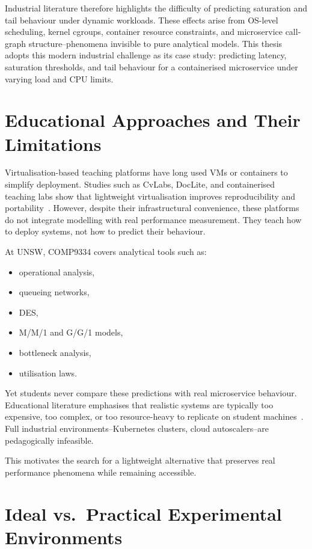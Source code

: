 Industrial literature therefore highlights the difficulty of predicting saturation and tail behaviour under dynamic workloads. These effects arise from OS-level scheduling, kernel cgroups, container resource constraints, and microservice call-graph structure--phenomena invisible to pure analytical models. This thesis adopts this modern industrial challenge as its case study: predicting latency, saturation thresholds, and tail behaviour for a containerised microservice under varying load and CPU limits.

\section{Educational Approaches and Their Limitations}

Virtualisation-based teaching platforms have long used VMs or containers to simplify deployment. Studies such as CvLabs, DocLite, and containerised teaching labs show that lightweight virtualisation improves reproducibility and portability~\cite{VituiChen2021}. However, despite their infrastructural convenience, these platforms do not integrate modelling with real performance measurement. They teach how to deploy systems, not how to predict their behaviour.


At UNSW, COMP9334 covers analytical tools such as:

\begin{itemize}
    \item operational analysis,
    \item queueing networks,
    \item DES,
    \item M/M/1 and G/G/1 models,
    \item bottleneck analysis,
    \item utilisation laws.
\end{itemize}

Yet students never compare these predictions with real microservice behaviour. Educational literature emphasises that realistic systems are typically too expensive, too complex, or too resource-heavy to replicate on student machines~\cite{Chen2020}. Full industrial environments--Kubernetes clusters, cloud autoscalers--are pedagogically infeasible.

This motivates the search for a lightweight alternative that preserves real performance phenomena while remaining accessible.

\section{Ideal vs.\ Practical Experimental Environments}

